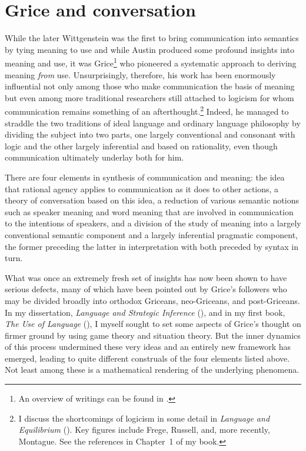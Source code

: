 \chapter{Grice and conversation} \label{ch:Grice}\largerpage[1]
While the later Wittgenstein was the first to bring communication into semantics by tying meaning to use and while Austin produced some profound insights into meaning and use, it was Grice\footnote{An overview of  writings can be found in \citet{neale:pgpl}.} who pioneered a systematic approach to deriving meaning \emph{from} use. Unsurprisingly, therefore, his work has been enormously influential not only among those who make communication the basis of meaning but even among more traditional researchers still attached to logicism for whom communication remains something of an afterthought.\footnote{I discuss the shortcomings of logicism in some detail in \emph{Language and Equilibrium} (\citeyear[Chapter~1]{parikh:le}). Key figures include Frege, Russell, and, more recently, Montague. See the references in Chapter~1 of my book.} Indeed, he managed to straddle the two traditions of ideal language and ordinary language philosophy by dividing the subject into two parts, one largely conventional and consonant with logic and the other largely inferential and based on rationality, even though communication ultimately underlay both for him. 

There are four elements in  synthesis of communication and meaning: the idea that rational agency applies to communication as it does to other actions, a theory of conversation based on this idea, a reduction of various semantic notions such as speaker meaning and word meaning that are involved in communication to the intentions of speakers, and a division of the study of meaning into a largely conventional semantic component and a largely inferential pragmatic component, the former preceding the latter in interpretation with both preceded by syntax in turn. 

What was once an extremely fresh set of insights has now been shown to have serious defects, many of which have been pointed out by Grice's followers who may be divided broadly into orthodox Griceans, neo-Griceans, and post-Griceans. In my  dissertation, \emph{Language and Strategic Inference} (\citeyear{parikh:diss}), and in my first book, \emph{The Use of Language} (\citeyear{parikh:ul}), I myself sought to set some aspects of Grice's thought on firmer ground by using game theory and situation theory. But the inner dynamics of this process undermined these very ideas and an entirely new framework has emerged, leading to quite different construals of the four elements listed above. Not least among these is a mathematical rendering of the underlying phenomena.


